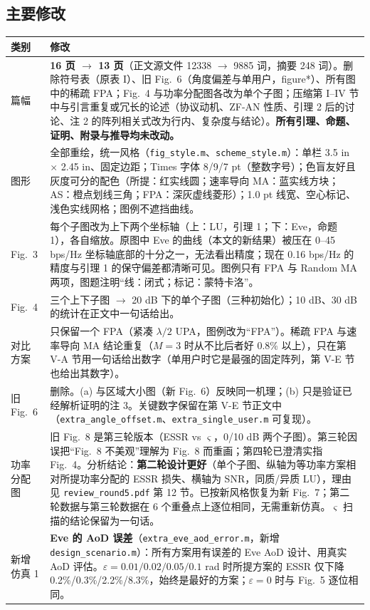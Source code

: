 \documentclass[11pt,a4paper]{ctexart}
\newcommand{\code}[1]{\texttt{#1}}
\begin{document}
\subsection{主要修改}
\begin{longtable}{p{2.6cm}p{13.1cm}}
\toprule
类别 & 修改 \\ \midrule
篇幅 & \textbf{16 页 $\to$ 13 页}（正文源文件 12338 $\to$ 9885 词，摘要 248 词）。删除符号表（原表 I）、旧 Fig.~6（角度偏差与单用户，figure*）、所有图中的稀疏 FPA；Fig.~4 与功率分配图各改为单个子图；压缩第 I--IV 节中与引言重复或冗长的论述（协议动机、ZF-AN 性质、引理 2 后的讨论、注 2 的阵列相关式改为行内、复杂度与结论）。\textbf{所有引理、命题、证明、附录与推导均未改动。}\\
图形 & 全部重绘，统一风格（\code{fig\_style.m}、\code{scheme\_style.m}）：单栏 3.5 in $\times$ 2.45 in、固定边距；Times 字体 8/9/7 pt（整数字号）；色盲友好且灰度可分的配色（所提：红实线圆；速率导向 MA：蓝实线方块；AS：橙点划线三角；FPA：深灰虚线菱形）；1.0 pt 线宽、空心标记、浅色实线网格；图例不遮挡曲线。\\
Fig.~3 & 每个子图改为上下两个坐标轴（上：LU，引理 1；下：Eve，命题 1），各自缩放。原图中 Eve 的曲线（本文的新结果）被压在 0--45 bps/Hz 坐标轴底部的十分之一，无法看出精度；现在 0.16 bps/Hz 的精度与引理 1 的保守偏差都清晰可见。图例只有 FPA 与 Random MA 两项，图题注明“线：闭式；标记：蒙特卡洛”。\\
Fig.~4 & 三个上下子图 $\to$ 20 dB 下的单个子图（三种初始化）；10 dB、30 dB 的统计在正文中一句话给出。\\
对比方案 & 只保留一个 FPA（紧凑 $\lambda/2$ UPA，图例改为“FPA”）。稀疏 FPA 与速率导向 MA 结论重复（$M=3$ 时从不比后者好 0.8\% 以上），只在第 V-A 节用一句话给出数字（单用户时它是最强的固定阵列，第 V-E 节也给出其数字）。\\
旧 Fig.~6 & 删除。(a) 与区域大小图（新 Fig.~6）反映同一机理；(b) 只是验证已经解析证明的注 3。关键数字保留在第 V-E 节正文中（\code{extra\_angle\_offset.m}、\code{extra\_single\_user.m} 可复现）。\\
功率分配图 & 旧 Fig.~8 是第三轮版本（ESSR vs $\varsigma$，0/10 dB 两个子图）。第三轮因误把“Fig.~8 不美观”理解为 Fig.~8 而重画；第四轮已澄清实指 Fig.~4。分析结论：\textbf{第二轮设计更好}（单个子图、纵轴为等功率方案相对所提功率分配的 ESSR 损失、横轴为 SNR，同质/异质 LU），理由见 \code{review\_round5.pdf} 第 12 节。已按新风格恢复为新 Fig.~7；第二轮数据与第三轮数据在 6 个重叠点上逐位相同，无需重新仿真。$\varsigma$ 扫描的结论保留为一句话。\\
新增仿真 1 & \textbf{Eve 的 AoD 误差}（\code{extra\_eve\_aod\_error.m}，新增 \code{design\_scenario.m}）：所有方案用有误差的 Eve AoD 设计、用真实 AoD 评估。$\varepsilon=0.01/0.02/0.05/0.1$ rad 时所提方案的 ESSR 仅下降 0.2\%/0.3\%/2.2\%/8.3\%，始终是最好的方案；$\varepsilon=0$ 时与 Fig.~5 逐位相同。\\

\end{longtable}
\end{document}
